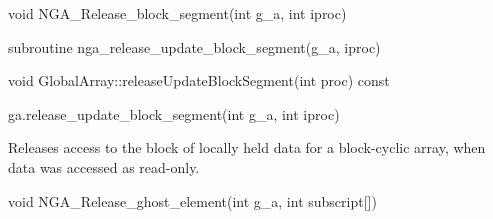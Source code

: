 \documentclass[10pt]{article}
\begin{document}
\begin{capi}
\begin{ccode}
void NGA_Release_block_segment(int g_a, int iproc)
\end{ccode}
\begin{funcargs}
\end{funcargs}
\end{capi}

\begin{fapi}
\begin{fcode}
subroutine nga_release_update_block_segment(g_a, iproc)
\end{fcode}
\begin{funcargs}
\end{funcargs}
\end{fapi}

\begin{cxxapi}
\begin{cxxcode}
void GlobalArray::releaseUpdateBlockSegment(int proc) const
\end{cxxcode}
\begin{funcargs}
\end{funcargs}
\end{cxxapi}

\begin{pyapi}
\begin{pycode}
ga.release_update_block_segment(int g_a, int iproc)
\end{pycode}
\begin{funcargs}
\end{funcargs}
\end{pyapi}

\local

\begin{desc}

Releases access to the block of locally held data for a block-cyclic array,
when data was accessed as read-only.

\end{desc}



\begin{capi}
\begin{ccode}
void NGA_Release_ghost_element(int g_a, int subscript[])
\end{ccode}
\begin{funcargs}
\end{funcargs}
\end{capi}
\end{document}
